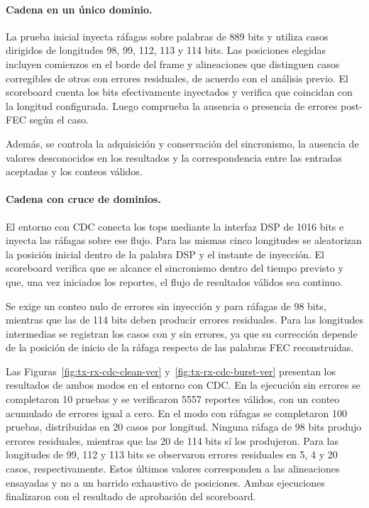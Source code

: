 \documentclass[10pt,a4paper]{article}
\begin{document}
\paragraph{Cadena en un único dominio.}
La prueba inicial inyecta ráfagas sobre palabras de 889 bits y utiliza
casos dirigidos de longitudes 98, 99, 112, 113 y 114 bits. Las 
posiciones elegidas incluyen comienzos en el borde del frame y 
alineaciones que distinguen casos corregibles de otros con errores 
residuales, de acuerdo con el análisis previo. El scoreboard cuenta 
los bits efectivamente inyectados y verifica que coincidan con la 
longitud configurada. Luego comprueba la ausencia o presencia de 
errores post-FEC según el caso.

Además, se controla la adquisición y conservación del sincronismo,
la ausencia de valores desconocidos en los resultados y la
correspondencia entre las entradas aceptadas y los conteos válidos.

\paragraph{Cadena con cruce de dominios.}
El entorno con CDC conecta los tops mediante la interfaz DSP de
1016 bits e inyecta las ráfagas sobre ese flujo. Para las mismas
cinco longitudes se aleatorizan la posición inicial dentro de la
palabra DSP y el instante de inyección. El scoreboard verifica que
se alcance el sincronismo dentro del tiempo previsto y que, una vez
iniciados los reportes, el flujo de resultados válidos sea continuo.

Se exige un conteo nulo de errores sin inyección y para ráfagas de 
98 bits, mientras que las de 114 bits deben producir errores residuales.
Para las longitudes intermedias se registran los casos con y sin
errores, ya que su corrección depende de la posición de inicio de
la ráfaga respecto de las palabras FEC reconstruidas.

Las Figuras~\ref{fig:tx-rx-cdc-clean-ver} y~\ref{fig:tx-rx-cdc-burst-ver}
presentan los resultados de ambos modos en el entorno con CDC.
En la ejecución sin errores se completaron 10 pruebas y se verificaron
5557 reportes válidos, con un conteo acumulado de errores igual a cero.
En el modo con ráfagas se completaron 100 pruebas, distribuidas en
20 casos por longitud. Ninguna ráfaga de 98 bits produjo errores
residuales, mientras que las 20 de 114 bits sí los produjeron.
Para las longitudes de 99, 112 y 113 bits se observaron errores
residuales en 5, 4 y 20 casos, respectivamente. Estos últimos valores
corresponden a las alineaciones ensayadas y no a un barrido exhaustivo
de posiciones. Ambas ejecuciones finalizaron con el resultado de
aprobación del scoreboard.
\end{document}
